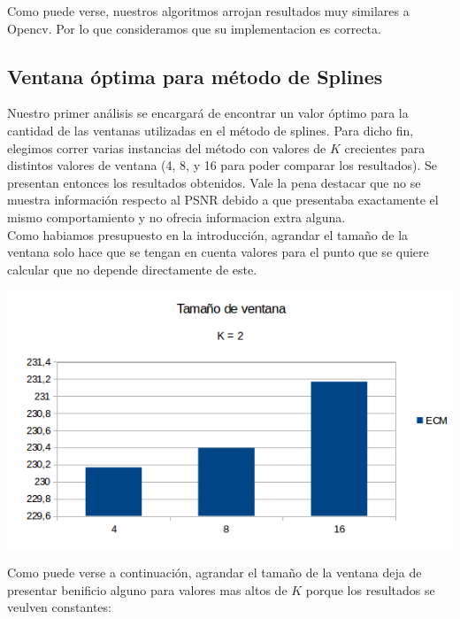 Como puede verse, nuestros algoritmos arrojan resultados muy similares a Opencv. Por lo que consideramos que su implementacion es correcta.

\subsection{Ventana óptima para método de Splines}
Nuestro primer análisis se encargará de encontrar un valor óptimo para la cantidad de las ventanas utilizadas en el método de splines.
Para dicho fin, elegimos correr varias instancias del método con valores de $K$ crecientes para distintos valores de ventana (4, 8, y 16 para poder comparar los resultados). Se presentan entonces los resultados obtenidos. Vale la pena destacar que no se muestra información respecto al PSNR debido a que presentaba exactamente el mismo comportamiento y no ofrecia informacion extra alguna.
\\
Como habiamos presupuesto en la introducción, agrandar el tamaño de la ventana solo hace que se tengan en cuenta valores para el punto que se quiere calcular que no depende directamente de este. 

\begin{center}
\includegraphics[scale=0.50]{imagenes/VK2.png}
\end{center}

Como puede verse a continuación, agrandar el tamaño de la ventana deja de presentar benificio alguno para valores mas altos de $K$ porque los resultados se veulven constantes:

